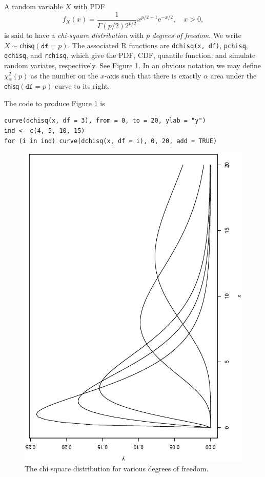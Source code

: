 \documentclass[captions=tableheading]{scrbook}
\begin{document}
A random variable \(X\) with PDF
\begin{equation}
f_{X}(x)=\frac{1}{\Gamma(p/2)2^{p/2}}x^{p/2-1}\mathrm{e}^{-x/2},\quad x>0,
\end{equation}
is said to have a \emph{chi-square distribution} with \(p\) \emph{degrees of freedom}. We write \(X\sim\mathsf{chisq}(\mathtt{df}=p)\). The associated \textsf{R} functions are \texttt{dchisq(x, df)}, \texttt{pchisq}, \texttt{qchisq}, and \texttt{rchisq}, which give the PDF, CDF, quantile function, and simulate random variates, respectively. See Figure \ref{fig:chisq-dist-vary-df}. In an obvious notation we may define \(\chi_{\alpha}^{2}(p)\) as the number on the \(x\)-axis such that there is exactly \(\alpha\) area under the \(\mathsf{chisq}(\mathtt{df}=p)\) curve to its right.

The code to produce Figure \ref{fig:chisq-dist-vary-df} is


\begin{verbatim}
curve(dchisq(x, df = 3), from = 0, to = 20, ylab = "y")
ind <- c(4, 5, 10, 15)
for (i in ind) curve(dchisq(x, df = i), 0, 20, add = TRUE)
\end{verbatim}



\begin{figure}[th]
    \includegraphics[angle=270, totalheight=4in]{img/chisq-dist-vary-df.ps}
    \caption[Chi square distribution for various degrees of freedom]{\small The chi square distribution for various degrees of freedom.}
    \label{fig:chisq-dist-vary-df}
  \end{figure}
\end{document}
